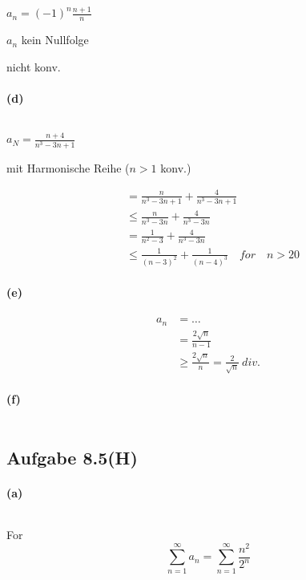 $a_n=(-1)^n\frac{n+1}{n}$

$a_n$ kein Nullfolge

nicht konv.

\paragraph{(d)}
$ $\newline

$a_N=\frac{n+4}{n^3-3n+1}$

mit Harmonische Reihe ($n>1$ konv.)

\begin{align*}
&=\frac{n}{n^3-3n+1}+\frac{4}{n^3-3n+1}\\
&\leq\frac{n}{n^3-3n}+\frac{4}{n^3-3n}\\
&=\frac{1}{n^2-3}+\frac{4}{n^3-3n}\\
&\leq\frac{1}{(n-3)^2}+\frac{1}{(n-4)^3}\hspace{1em}for\hspace{1em}n>20
\end{align*}

\newpage

\paragraph{(e)}
\begin{align*}
a_n
&=\ldots\\
&=\frac{2\sqrt{n}}{n-1}\\
&\geq\frac{2\sqrt{n}}{n}=\frac{2}{\sqrt{n}}\ div.
\end{align*}

\paragraph{(f)}
$ $\newline

\newpage

\subsection{Aufgabe 8.5(H)}

\paragraph{(a)}
$ $\newline

For
\begin{equation*}
\sum_{n=1}^{\infty}a_n=\sum_{n=1}^{\infty}\frac{n^2}{2^n}
\end{equation*}

